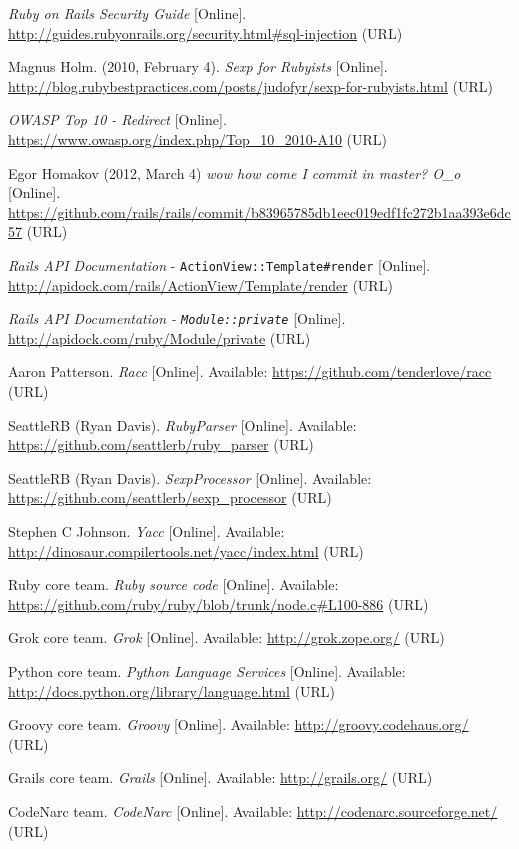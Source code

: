 \documentclass[conference]{IEEEtran}
\begin{document}
\begin{thebibliography}{1}
    \emph{Ruby on Rails Security Guide} [Online]. \url{http://guides.rubyonrails.org/security.html\#sql-injection} (URL)

    Magnus Holm. (2010, February 4). \emph{Sexp for Rubyists} [Online]. \url{http://blog.rubybestpractices.com/posts/judofyr/sexp-for-rubyists.html} (URL)

    \emph{OWASP Top 10 - Redirect} [Online]. \url{https://www.owasp.org/index.php/Top_10_2010-A10} (URL)

    Egor Homakov (2012, March 4) \emph{wow how come I commit in master? O\_o} [Online]. \url{https://github.com/rails/rails/commit/b83965785db1eec019edf1fc272b1aa393e6dc57} (URL)

    \emph{Rails API Documentation} - \texttt{ActionView::Template\#render} [Online]. \url{http://apidock.com/rails/ActionView/Template/render} (URL)

    \emph{Rails API Documentation - \texttt{Module::private}} [Online]. \url{http://apidock.com/ruby/Module/private} (URL)

    Aaron Patterson. \emph{Racc} [Online].  Available: \url{https://github.com/tenderlove/racc} (URL)

    SeattleRB (Ryan Davis). \emph{RubyParser} [Online].  Available: \url{https://github.com/seattlerb/ruby_parser} (URL)

    SeattleRB (Ryan Davis). \emph{SexpProcessor} [Online].  Available: \url{https://github.com/seattlerb/sexp_processor} (URL)

    Stephen C Johnson. \emph{Yacc} [Online].  Available: \url{http://dinosaur.compilertools.net/yacc/index.html} (URL)

    Ruby core team. \emph{Ruby source code} [Online].  Available: \url{https://github.com/ruby/ruby/blob/trunk/node.c\#L100-886} (URL)

    Grok core team. \emph{Grok} [Online].  Available: \url{http://grok.zope.org/} (URL)

    Python core team.  \emph{Python Language Services} [Online].  Available: \url{http://docs.python.org/library/language.html} (URL)

    Groovy core team. \emph{Groovy} [Online].  Available: \url{http://groovy.codehaus.org/} (URL)

    Grails core team. \emph{Grails} [Online].  Available: \url{http://grails.org/} (URL)

    CodeNarc team.  \emph{CodeNarc} [Online].  Available: \url{http://codenarc.sourceforge.net/} (URL)

\end{thebibliography}
\end{document}
